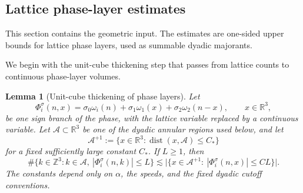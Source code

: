 \documentclass[10pt]{amsart}
\numberwithin{equation}{section}
\theoremstyle{plain}
\newtheorem{lemma}[theorem]{Lemma}
\theoremstyle{definition}
\theoremstyle{remark}
\newcommand{\R}{\mathbb{R}}
\newcommand{\Z}{\mathbb{Z}}
\DeclareMathOperator{\dist}{dist}
\begin{document}
\subsection{Lattice phase-layer estimates}

This section contains the geometric input.  The estimates are one-sided upper bounds for lattice phase layers, used as summable dyadic majorants.

We begin with the unit-cube thickening step that passes from lattice counts to continuous phase-layer volumes.

\begin{lemma}[Unit-cube thickening of phase layers]\label{lem:B-thickening}
Let
\[
        \Phi_i^\sigma(n,x)
        =
        \sigma_0\omega_i(n)+\sigma_1\omega_1(x)+\sigma_2\omega_2(n-x),
        \qquad x\in\R^3,
\]
be one sign branch of the phase, with the lattice variable replaced by a continuous variable.  Let \(\mathcal A\subset\R^3\) be one of the dyadic annular regions used below, and let
\[
        \mathcal A^{+1}:=
        \{x\in\R^3:\dist(x,\mathcal A)\le C_*\}
\]
for a fixed sufficiently large constant \(C_*\).  If \(L\ge1\), then
\[
        \#\{k\in\Z^3:k\in\mathcal A,\ |\Phi_i^\sigma(n,k)|\le L\}
        \lesssim
        \bigl|\{x\in\mathcal A^{+1}:\ |\Phi_i^\sigma(n,x)|\le CL\}\bigr|.
\]
The constants depend only on \(\alpha\), the speeds, and the fixed dyadic cutoff conventions.
\end{lemma}
\end{document}
